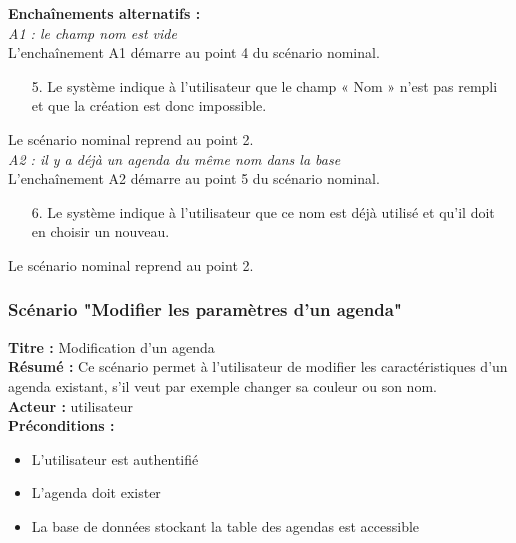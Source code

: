 \documentclass[12pt , a4paper]{article}
\begin{document}
\noindent\textbf{Encha\^inements alternatifs :}\\
\noindent\textit{A1 : le champ nom est vide}\\
L'encha\^inement A1 démarre au point 4 du scénario nominal.
\begin{enumerate}
\item[5.] Le système indique à l’utilisateur que le champ « Nom » n’est pas rempli et que la création est donc impossible.
\end{enumerate}
Le scénario nominal reprend au point 2.\\


\noindent\textit{A2 : il y a déjà un agenda du même nom dans la base}\\
L'encha\^inement A2 démarre au point 5 du scénario nominal.
\begin{enumerate}
\item[6.] Le système indique à l’utilisateur que ce nom est déjà utilisé et qu’il doit en choisir un nouveau.
\end{enumerate}
Le scénario nominal reprend au point 2.\\


\subsubsection{Scénario "Modifier les paramètres d'un agenda"}
\noindent\textbf{Titre : } Modification d’un agenda\\
\textbf{Résumé : } Ce scénario permet à l’utilisateur de modifier les caractéristiques d’un agenda existant, s’il veut par exemple changer sa couleur ou son nom.\\
\textbf{Acteur : }utilisateur\\

\noindent\textbf{Préconditions :}
\begin{itemize}
\item L’utilisateur est authentifié
\item L'agenda doit exister
\item La base de données stockant la table des agendas est accessible\\
\end{itemize}
\end{document}
